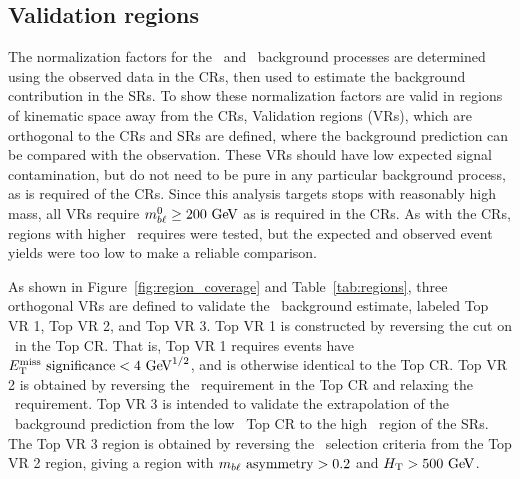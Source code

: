 \subsection{Validation regions}
\label{sec:vr}

The normalization factors for the \TTBAR\ and \ZGAMMAJETS\ background processes
are determined using the observed data in the CRs, then used to estimate the
background contribution in the SRs.
To show these normalization factors are valid in regions of kinematic space away
from the CRs, Validation regions (VRs), which are orthogonal to the CRs and SRs
are defined, where the background prediction can be compared with the
observation.
These VRs should have low expected signal contamination, but do not need to be
pure in any particular background process, as is required of the CRs.
Since this analysis targets stops with reasonably high mass, all VRs require
$\MBL^0 \geq 200 \GeV$ as is required in the CRs.
As with the CRs, regions with higher \MBL\ requires were tested, but the
expected and observed event yields were too low to make a reliable comparison.

As shown in Figure~\ref{fig:region_coverage} and Table~\ref{tab:regions},
three orthogonal VRs are defined to validate the \TTBAR\ background estimate,
labeled Top VR 1, Top VR 2, and Top VR 3.
Top VR 1 is constructed by reversing the cut on \METSIG\ in the Top CR.
That is, Top VR 1 requires events have $\METSIG < 4 \GeV^{1/2}$, and is
otherwise identical to the Top CR.
Top VR 2 is obtained by reversing the \MBLASYM\ requirement in the Top CR and
relaxing the \METSIG\ requirement.
Top VR 3 is intended to validate the extrapolation of the \TTBAR\ background
prediction from the low \HT\ Top CR to the high \HT\ region of the SRs.
The Top VR 3 region is obtained by reversing the \HT\ selection criteria from
the Top VR 2 region, giving a region with $m_{b\ell}~\mathrm{asymmetry} > 0.2$ and $\HT > 500 \GeV$.

